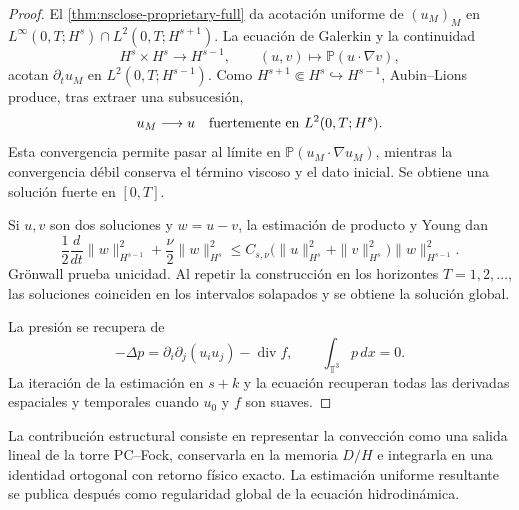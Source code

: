 \begin{proof}
El \cref{thm:nsclose-proprietary-full} da acotación uniforme de
\((u_M)_M\) en \(L^\infty(0,T;H^s)\cap L^2(0,T;H^{s+1})\). La ecuación de
Galerkin y la continuidad
\[
 H^s\times H^s\longrightarrow H^{s-1},
 \qquad (u,v)\longmapsto\mathbb P(u\cdot\nabla v),
\]
acotan \(\partial_tu_M\) en \(L^2(0,T;H^{s-1})\). Como
\(H^{s+1}\Subset H^s\hookrightarrow H^{s-1}\), Aubin--Lions produce, tras
extraer una subsucesión,
\[
 u_M\longrightarrow u\quad\hbox{fuertemente en }L^2(0,T;H^s).
\]
Esta convergencia permite pasar al límite en
\(\mathbb P(u_M\cdot\nabla u_M)\), mientras la convergencia débil conserva el
término viscoso y el dato inicial. Se obtiene una solución fuerte en
\([0,T]\).

Si \(u,v\) son dos soluciones y \(w=u-v\), la estimación de producto y
Young dan
\[
 \frac12\frac d{dt}\|w\|_{H^{s-1}}^2
 +\frac\nu2\|w\|_{H^s}^2
 \le C_{s,\nu}\bigl(\|u\|_{H^s}^2+\|v\|_{H^s}^2\bigr)
 \|w\|_{H^{s-1}}^2.
\]
Grönwall prueba unicidad. Al repetir la construcción en los horizontes
\(T=1,2,\ldots\), las soluciones coinciden en los intervalos solapados y se
obtiene la solución global.

La presión se recupera de
\begin{equation}
 -\Delta p=\partial_i\partial_j(u_i u_j)-\operatorname{div}f,
 \qquad \int_{\mathbb T^3}p\,dx=0.
 \label{eq:nsclose-pressure-recovery}
\end{equation}
La iteración de la estimación en \(s+k\) y la ecuación recuperan todas las
derivadas espaciales y temporales cuando \(u_0\) y \(f\) son suaves.
\end{proof}

La contribución estructural consiste en representar la convección como una
salida lineal de la torre PC--Fock, conservarla en la memoria \(D/H\) e
integrarla en una identidad ortogonal con retorno físico exacto. La
estimación uniforme resultante se publica después como regularidad global de
la ecuación hidrodinámica.
